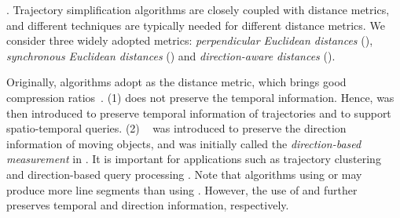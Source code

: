 . Trajectory simplification algorithms are closely coupled with distance metrics, and different techniques are typically needed for different distance metrics.  We consider three widely adopted metrics: \emph{perpendicular Euclidean distances} (\ped), \emph{synchronous Euclidean distances} (\sed) and \emph{direction-aware distances} (\dad).


Originally, \lsa algorithms adopt \ped as the distance metric, which brings good compression ratios~\cite{Douglas:Peucker, Hershberger:Speeding, Liu:BQS, Muckell:Compression, Chen:Trajectory, Cao:Spatio, Shi:Survey}. (1) \ped does not preserve the temporal information. Hence, \sed was then introduced to preserve temporal information of trajectories and to support spatio-temporal queries\cite{Meratnia:Spatiotemporal}.
(2) \dad~\cite{Long:Direction, Zhang:Evaluation} was introduced to preserve the direction information of moving objects, and was initially called the \emph{direction-based measurement} in \cite{Long:Direction}. It is important for applications such as trajectory clustering and direction-based query processing \cite{Long:Direction,Long:Mining}.
%
Note that \lsa algorithms using \sed or \dad may produce more line segments than using \ped. However, the use of \sed and \dad further preserves temporal and direction information, respectively.



